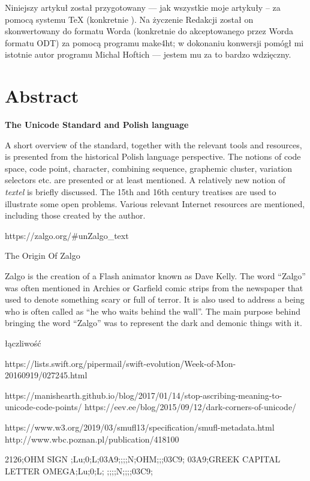 Niniejszy artykuł został przygotowany --- jak wszystkie moje artykuły
-- za pomocą systemu \TeX{} (konkretnie \XeLaTeX). Na życzenie
Redakcji został on skonwertowany do formatu Worda (konkretnie do
akceptowanego przez Worda formatu \textsf{ODT}) za pomocą programu
\textsf{make4ht}; w dokonaniu konwersji pomógł mi istotnie autor
programu Michal Hoftich --- jestem mu za to bardzo wdzięczny.


\section*{Abstract}
\label{sec:abstract}

\textbf{The Unicode Standard and Polish language}

A short overview of the standard, together with the relevant tools and
resources, is presented from the historical Polish language
perspective. The notions of code space, code point, character,
combining sequence, graphemic cluster, variation selectors etc. are
presented or at least mentioned. A relatively new notion of
\textit{textel} is briefly discussed. The 15th and 16th century
treatises are used to illustrate some open problems. Various relevant
Internet resources are mentioned, including those created by the
author.


\printbibliography




https://zalgo.org/#unZalgo_text

The Origin Of Zalgo

Zalgo is the creation of a Flash animator known as Dave Kelly. The
word “Zalgo” was often mentioned in Archies or Garfield comic strips
from the newspaper that used to denote something scary or full of
terror. It is also used to address a being who is often called as “he
who waits behind the wall”. The main purpose behind bringing the word
“Zalgo” was to represent the dark and demonic things with it.

łączliwość

https://lists.swift.org/pipermail/swift-evolution/Week-of-Mon-20160919/027245.html

https://manishearth.github.io/blog/2017/01/14/stop-ascribing-meaning-to-unicode-code-points/
https://eev.ee/blog/2015/09/12/dark-corners-of-unicode/

https://www.w3.org/2019/03/smufl13/specification/smufl-metadata.html
http://www.wbc.poznan.pl/publication/418100

2126;OHM SIGN                  ;Lu;0;L;03A9;;;;N;OHM;;;03C9;
03A9;GREEK CAPITAL LETTER OMEGA;Lu;0;L;    ;;;;N;;;;03C9;

